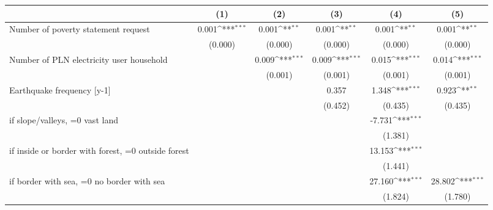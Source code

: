 {
\def\sym#1{\ifmmode^{#1}\else\(^{#1}\)\fi}
\begin{tabular}{l*{5}{c}}
\toprule
                    &\multicolumn{1}{c}{(1)}         &\multicolumn{1}{c}{(2)}         &\multicolumn{1}{c}{(3)}         &\multicolumn{1}{c}{(4)}         &\multicolumn{1}{c}{(5)}         \\
\midrule
Number of poverty statement request&       0.001\sym{***}&       0.001\sym{**} &       0.001\sym{**} &       0.001\sym{**} &       0.001\sym{**} \\
                    &     (0.000)         &     (0.000)         &     (0.000)         &     (0.000)         &     (0.000)         \\
\addlinespace
Number of PLN electricity user household&                     &       0.009\sym{***}&       0.009\sym{***}&       0.015\sym{***}&       0.014\sym{***}\\
                    &                     &     (0.001)         &     (0.001)         &     (0.001)         &     (0.001)         \\
\addlinespace
Earthquake frequency [y-1]&                     &                     &       0.357         &       1.348\sym{***}&       0.923\sym{**} \\
                    &                     &                     &     (0.452)         &     (0.435)         &     (0.435)         \\
\addlinespace
=1 if slope/valleys, =0 vast land&                     &                     &                     &      -7.731\sym{***}&                     \\
                    &                     &                     &                     &     (1.381)         &                     \\
\addlinespace
=1 if inside or border with forest, =0 outside forest&                     &                     &                     &      13.153\sym{***}&                     \\
                    &                     &                     &                     &     (1.441)         &                     \\
\addlinespace
=1 if border with sea, =0 no border with sea&                     &                     &                     &      27.160\sym{***}&      28.802\sym{***}\\
                    &                     &                     &                     &     (1.824)         &     (1.780)         \\

\end{tabular}}
